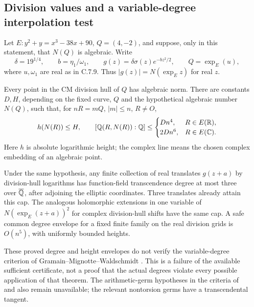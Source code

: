 \subsection{Division values and a variable-degree interpolation test}

\begin{statement}
Let $E:y^2+y=x^3-38x+90$, $Q=(4,-2)$, and suppose, only in
this statement, that $N(Q)$ is algebraic.  Write
\[
 \delta=19^{1/4},\qquad b=\eta_1/\omega_1,\qquad
 g(z)=\delta\sigma(z)e^{-bz^2/2},\qquad Q=\exp_E(u),
\]
where $u,\omega_1$ are real as in C.7.9.  Thus
$|g(z)|=N(\exp_E z)$ for real $z$.

Every point in the CM division hull of $Q$ has algebraic norm.
There are constants $D,H$, depending on the fixed curve, $Q$ and
the hypothetical algebraic number $N(Q)$, such that, for
$nR=mQ$, $|m|\leq n$, $R\ne O$,
\[
 h(N(R))\leq H,
 \qquad
 [\mathbb Q(R,N(R)):\mathbb Q]\leq
 \begin{cases}Dn^4,&R\in E(\mathbb R),\\2Dn^6,&R\in E(\mathbb C).
 \end{cases}
\]
Here $h$ is absolute logarithmic height; the complex line means
the chosen complex embedding of an algebraic point.

Under the same hypothesis, any finite collection of real translates
$g(z+a)$ by division-hull logarithms has function-field
transcendence degree at most three over $\overline{\mathbb Q}$, after
adjoining the elliptic coordinates.  Three translates already
attain this cap.  The analogous holomorphic extensions in one
variable of $N(\exp_E(z+a))^2$ for complex division-hull shifts
have the same cap.  A safe common degree envelope for a fixed
finite family on the real division grids is $O(n^5)$, with
uniformly bounded heights.

These proved degree and height envelopes do not verify the
variable-degree criterion of Gramain--Mignotte--Waldschmidt
\citep[Theorem 2.1]{gramain1986values}.  This is a failure of the
available sufficient certificate, not a proof that the actual
degrees violate every possible application of that theorem.
The arithmetic-germ hypotheses in the criteria of
\citet[Theorem 6.1]{herblot2012meromorphic} and
\citet[Theorem 4.16]{gasbarri2010analytic} also remain unavailable;
the relevant nontorsion germs have a transcendental tangent.
\end{statement}

